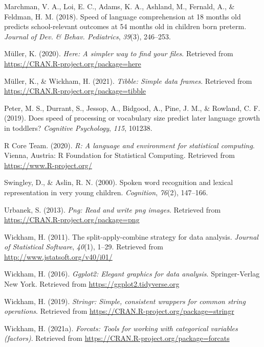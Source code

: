 \documentclass[
  english,
  man,floatsintext]{apa6}
\begin{document}
\leavevmode\hypertarget{ref-Marchman2018}{}%
Marchman, V. A., Loi, E. C., Adams, K. A., Ashland, M., Fernald, A., \& Feldman, H. M. (2018). Speed of language comprehension at 18 months old predicts school-relevant outcomes at 54 months old in children born preterm. \emph{Journal of Dev. \& Behav. Pediatrics}, \emph{39}(3), 246--253.

\leavevmode\hypertarget{ref-R-here}{}%
Müller, K. (2020). \emph{Here: A simpler way to find your files}. Retrieved from \url{https://CRAN.R-project.org/package=here}

\leavevmode\hypertarget{ref-R-tibble}{}%
Müller, K., \& Wickham, H. (2021). \emph{Tibble: Simple data frames}. Retrieved from \url{https://CRAN.R-project.org/package=tibble}

\leavevmode\hypertarget{ref-peter2019}{}%
Peter, M. S., Durrant, S., Jessop, A., Bidgood, A., Pine, J. M., \& Rowland, C. F. (2019). Does speed of processing or vocabulary size predict later language growth in toddlers? \emph{Cognitive Psychology}, \emph{115}, 101238.

\leavevmode\hypertarget{ref-R-base}{}%
R Core Team. (2020). \emph{R: A language and environment for statistical computing}. Vienna, Austria: R Foundation for Statistical Computing. Retrieved from \url{https://www.R-project.org/}

\leavevmode\hypertarget{ref-Swingley2000}{}%
Swingley, D., \& Aslin, R. N. (2000). Spoken word recognition and lexical representation in very young children. \emph{Cognition}, \emph{76}(2), 147--166.

\leavevmode\hypertarget{ref-R-png}{}%
Urbanek, S. (2013). \emph{Png: Read and write png images}. Retrieved from \url{https://CRAN.R-project.org/package=png}

\leavevmode\hypertarget{ref-R-plyr}{}%
Wickham, H. (2011). The split-apply-combine strategy for data analysis. \emph{Journal of Statistical Software}, \emph{40}(1), 1--29. Retrieved from \url{http://www.jstatsoft.org/v40/i01/}

\leavevmode\hypertarget{ref-R-ggplot2}{}%
Wickham, H. (2016). \emph{Ggplot2: Elegant graphics for data analysis}. Springer-Verlag New York. Retrieved from \url{https://ggplot2.tidyverse.org}

\leavevmode\hypertarget{ref-R-stringr}{}%
Wickham, H. (2019). \emph{Stringr: Simple, consistent wrappers for common string operations}. Retrieved from \url{https://CRAN.R-project.org/package=stringr}

\leavevmode\hypertarget{ref-R-forcats}{}%
Wickham, H. (2021a). \emph{Forcats: Tools for working with categorical variables (factors)}. Retrieved from \url{https://CRAN.R-project.org/package=forcats}
\end{document}
